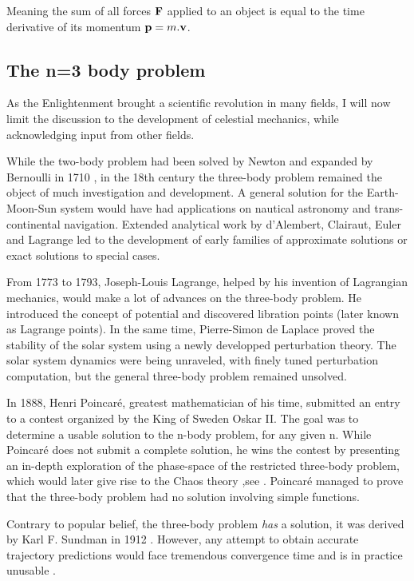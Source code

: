 Meaning the sum of all forces $\bold{F}$ applied to an object is equal to the time derivative of its momentum $\bold{p} = m.\bold{v}$.



\subsection*{The n=3 body problem}

As the Enlightenment brought a scientific revolution in many fields, I will now limit the discussion to the development of celestial mechanics, while acknowledging input from other fields.

While the two-body problem had been solved by Newton and expanded by Bernoulli in 1710 \citep{Barrow1997}, in the 18th century the three-body problem remained the object of much investigation and development. A general solution for the Earth-Moon-Sun system would have had applications on nautical astronomy and trans-continental navigation. Extended analytical work by d'Alembert, Clairaut, Euler and Lagrange led to the development of early families of approximate solutions or exact solutions to special cases.

From 1773 to 1793, Joseph-Louis Lagrange, helped by his invention of Lagrangian mechanics, would make a lot of advances on the three-body problem. He introduced the concept of potential and discovered libration points (later known as Lagrange points). In the same time, Pierre-Simon de Laplace proved the stability of the solar system using a newly developped perturbation theory. The solar system dynamics were being unraveled, with finely tuned perturbation computation, but the general three-body problem remained unsolved.

In 1888, Henri Poincaré, greatest mathematician of his time, submitted an entry to a contest organized by the King of Sweden Oskar II. The goal was to determine a usable solution to the n-body problem, for any given n. While Poincaré does not submit a complete solution, he wins the contest by presenting an in-depth exploration of the phase-space of the restricted three-body problem, which would later give rise to the Chaos theory ,see \cite{Yoccoz2010}. Poincaré managed to prove that the three-body problem had no  solution involving simple functions.

Contrary to popular belief, the three-body problem \textit{has} a solution, it was derived by Karl F. Sundman in 1912 \citep{Sundman1912}. However, any attempt to obtain accurate trajectory predictions would face tremendous convergence time and is in practice unusable \citep{Beloriszky1930}.

